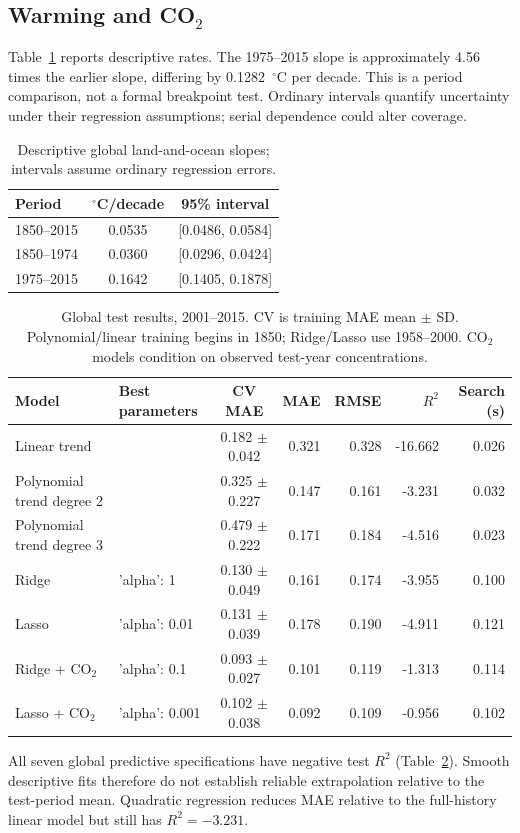 \documentclass[conference]{IEEEtran}
\begin{document}
\subsection{Warming and \texorpdfstring{CO$_2$}{CO2}}
Table~\ref{tab:slopes} reports descriptive rates. The 1975--2015 slope is approximately 4.56 times the earlier slope, differing by 0.1282~$^\circ$C per decade. This is a period comparison, not a formal breakpoint test. Ordinary intervals quantify uncertainty under their regression assumptions; serial dependence could alter coverage.
\begin{table}[t]\caption{Descriptive global land-and-ocean slopes; intervals assume ordinary regression errors.}\label{tab:slopes}\centering\footnotesize
\begin{tabular}{lcc}\toprule Period & $^\circ$C/decade & 95\% interval \\\midrule
1850--2015 & 0.0535 & [0.0486, 0.0584] \\
1850--1974 & 0.0360 & [0.0296, 0.0424] \\
1975--2015 & 0.1642 & [0.1405, 0.1878] \\\bottomrule\end{tabular}\end{table}
\begin{table}[!tbp]\caption{Global test results, 2001--2015. CV is training MAE mean $\pm$ SD. Polynomial/linear training begins in 1850; Ridge/Lasso use 1958--2000. CO$_2$ models condition on observed test-year concentrations.}\label{tab:globalmodels}\centering\scriptsize
\begin{tabular}{llcrrrr}\toprule Model & Best parameters & CV MAE & MAE & RMSE & $R^2$ & Search (s) \\\midrule

Linear trend & {} & 0.182 $\pm$ 0.042 & 0.321 & 0.328 & -16.662 & 0.026 \\
Polynomial trend degree 2 & {} & 0.325 $\pm$ 0.227 & 0.147 & 0.161 & -3.231 & 0.032 \\
Polynomial trend degree 3 & {} & 0.479 $\pm$ 0.222 & 0.171 & 0.184 & -4.516 & 0.023 \\
Ridge & {'alpha': 1} & 0.130 $\pm$ 0.049 & 0.161 & 0.174 & -3.955 & 0.100 \\
Lasso & {'alpha': 0.01} & 0.131 $\pm$ 0.039 & 0.178 & 0.190 & -4.911 & 0.121 \\
Ridge + CO$_2$ & {'alpha': 0.1} & 0.093 $\pm$ 0.027 & 0.101 & 0.119 & -1.313 & 0.114 \\
Lasso + CO$_2$ & {'alpha': 0.001} & 0.102 $\pm$ 0.038 & 0.092 & 0.109 & -0.956 & 0.102 \\

\bottomrule\end{tabular}\end{table}
All seven global predictive specifications have negative test $R^2$ (Table~\ref{tab:globalmodels}). Smooth descriptive fits therefore do not establish reliable extrapolation relative to the test-period mean. Quadratic regression reduces MAE relative to the full-history linear model but still has $R^2=-3.231$.
\end{document}
